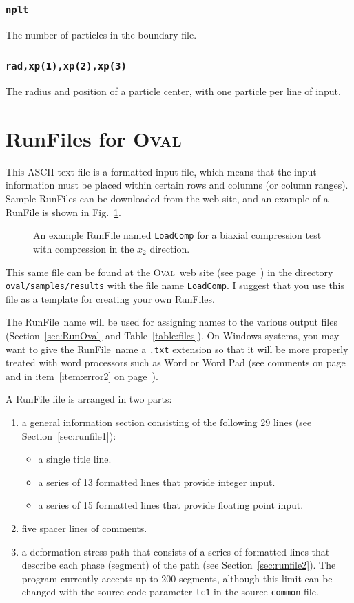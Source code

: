 \documentclass[letterpaper,11pt]{article}
\newcommand{\Oval}{\textsc{Oval}}
\newcommand{\RunFile}{\textsf{RunFile}}
\begin{document}
\subsubsection[\texttt{nplt}]{\texttt{nplt}}%
\label{sec:pb4}
The number of particles in the boundary file.
%
\subsubsection[\texttt{rad,xp(1)}]{\texttt{rad,xp(1),xp(2),xp(3)}}%
\label{sec:pb5}
The radius and position of a particle center, with one particle per line
of input.
%
\section{\textsf{RunFile}s for \Oval}\label{sec:RunFile}
This ASCII text file is a formatted input file, which means that
the input information must be placed within certain rows
and columns (or column ranges).
Sample \textsf{RunFile}s can be 
downloaded from the web site,
and an example of a \textsf{RunFile} is shown in Fig.~\ref{fig:LoadComp}.
%
\begin{figure}
\centering\footnotesize

\caption{An example \textsf{RunFile} named
\texttt{LoadComp} for a biaxial compression test
with compression in the $x_{2}$ direction.}
\label{fig:LoadComp}
\end{figure}
%
This same file 
can be found at the \Oval\ web site (see page~\pageref{page:WebSite})
in the directory \texttt{oval/samples/results} with the
file name \texttt{LoadComp}.
I suggest that you use this file as a template for creating your
own \RunFile s.
\par
The \RunFile\ name will be used for assigning
names to the various output files 
(Section~\ref{sec:RunOval} and Table~\ref{table:files}).
On Windows systems, you may want to give the \RunFile\ name a \texttt{.txt}
extension so that it will be more properly treated with word processors
such as Word or Word Pad
(see comments on page~\pageref{page:word} and
in item~\ref{item:error2} on page~\pageref{item:error2}).
\par
A \textsf{RunFile} file is arranged in two parts:
\begin{enumerate}
\item
a general information section consisting of the following 29 lines
(see Section~\ref{sec:runfile1}):
\begin{itemize}
\item
a single title line.
\item
a series of 13 formatted lines that provide integer input.
\item
a series of 15 formatted lines that provide floating point input.
\end{itemize}
\item
five spacer lines of comments.
\item
a deformation-stress path that consists of
a series of formatted lines that 
describe each phase (segment) of the path
(see Section~\ref{sec:runfile2}).
The program currently accepts up to 200 segments,
although this limit can be changed with the source code
parameter \texttt{lc1} in the source \texttt{common} file.
\end{enumerate}
\end{document}
